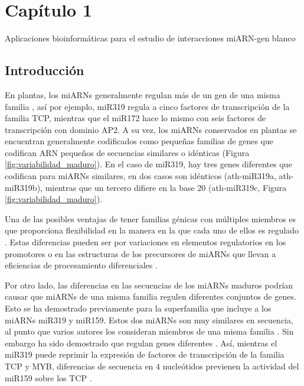 \graphicspath{{Chapter1/Figs/}}

\setcounter{chapter}{4}
\chapter*{Capítulo 1} 
\setcounter{table}{0}
\setcounter{figure}{0}
\setcounter{section}{0}


{\LARGE Aplicaciones bioinformáticas para el estudio de interacciones miARN-gen blanco}

\section{Introducción}

En plantas, los miARNs generalmente regulan más de un gen de una misma familia \citep{Jones-Rhoades2006}, así por ejemplo, miR319 regula a cinco factores de transcripción de la familia TCP, mientras que el miR172 hace lo mismo con seis factores de transcripción con dominio AP2.
A su vez, los miARNs conservados en plantas se encuentran generalmente codificados como pequeñas familias de genes que codifican ARN pequeños de secuencias similares o idénticas (Figura \ref{fig:variabilidad_maduro}).
En el caso de miR319, hay tres genes diferentes que codifican para miARNs similares, en dos casos son idénticos (ath-miR319a, ath-miR319b), mientras que un tercero difiere en la base 20 (ath-miR319c, Figura \ref{fig:variabilidad_maduro}). 

Una de las posibles ventajas de tener familias génicas con múltiples miembros es que proporciona flexibilidad en la manera en la que cada uno de ellos es regulado \citep{pmid21466971, pmid19699140}.
Estas diferencias pueden ser por variaciones en elementos regulatorios en los promotores o en las estructuras de los precursores de miARNs que llevan a eficiencias de procesamiento diferenciales \citep{pmid19699140}.

Por otro lado, las diferencias en las secuencias de los miARNs maduros podrían causar que miARNs de una misma familia regulen diferentes conjuntos de genes.
Esto se ha demostrado previamente para la superfamilia que incluye a los miARNs miR319 y miR159.
Estos dos miARNs son muy similares en secuencia, al punto que varios autores los consideran miembros de una misma familia \citep{Jones-Rhoades2006}.
Sin embargo ha sido demostrado que regulan genes diferentes \citep{Schwab2005517, pmid12931144,Palatnik2007}.
Así, mientras el miR319 puede reprimir la expresión de factores de transcripción de la familia TCP y MYB, diferencias de secuencia en 4 nucleótidos previenen la actividad del miR159 sobre los TCP \citep{Palatnik2007}.

